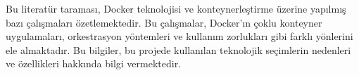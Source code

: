 Bu literatür taraması, Docker teknolojisi ve konteynerleştirme üzerine yapılmış bazı çalışmaları özetlemektedir. Bu çalışmalar, Docker'ın çoklu konteyner uygulamaları, orkestrasyon yöntemleri ve kullanım zorlukları gibi farklı yönlerini ele almaktadır. Bu bilgiler, bu projede kullanılan teknolojik seçimlerin nedenleri ve özellikleri hakkında bilgi vermektedir.